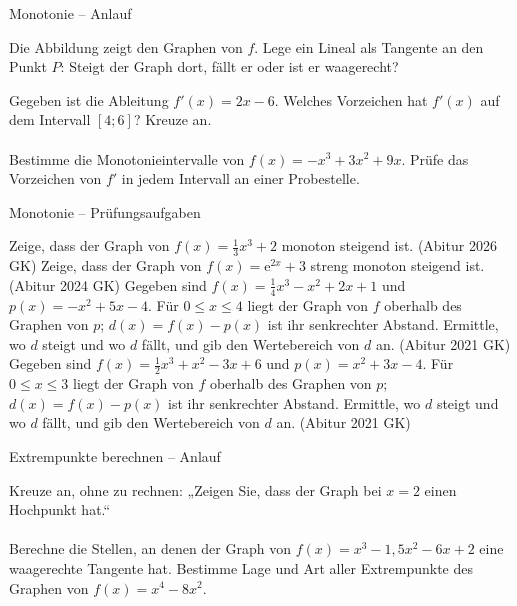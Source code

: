 \setcounter{aufgabe}{15}

\begin{aufgabe}{Monotonie – Anlauf}
\begin{teile}
\teil Die Abbildung zeigt den Graphen von $f$. Lege ein Lineal als Tangente an den Punkt $P$: Steigt der Graph dort, fällt er oder ist er waagerecht? \\   

\begin{ksys}[xmin=-3,xmax=3,ymin=-3,ymax=3,ablesen]   \end{ksys}
\teil Gegeben ist die Ableitung $f'(x) = 2x - 6$. Welches Vorzeichen hat $f'(x)$ auf dem Intervall $[4; 6]$? Kreuze an. \\  \\ 
\teil Bestimme die Monotonieintervalle von $f(x) = -x^3 + 3x^2 + 9x$. Prüfe das Vorzeichen von $f'$ in jedem Intervall an einer Probestelle.
\end{teile}
\end{aufgabe}

\begin{aufgabe}{Monotonie – Prüfungsaufgaben}
\begin{teile}
\teil Zeige, dass der Graph von $f(x) = \frac{1}{3}x^3 + 2$ monoton steigend ist. \hfill (Abitur 2026 GK)
\teil Zeige, dass der Graph von $f(x) = \mathrm{e}^{2x} + 3$ streng monoton steigend ist. \hfill (Abitur 2024 GK)
\teil Gegeben sind $f(x) = \frac{1}{4}x^3 - x^2 + 2x + 1$ und $p(x) = -x^2 + 5x - 4$. Für $0 \le x \le 4$ liegt der Graph von $f$ oberhalb des Graphen von $p$; $d(x) = f(x) - p(x)$ ist ihr senkrechter Abstand. Ermittle, wo $d$ steigt und wo $d$ fällt, und gib den Wertebereich von $d$ an. \hfill (Abitur 2021 GK)
\teil Gegeben sind $f(x) = \frac{1}{2}x^3 + x^2 - 3x + 6$ und $p(x) = x^2 + 3x - 4$. Für $0 \le x \le 3$ liegt der Graph von $f$ oberhalb des Graphen von $p$; $d(x) = f(x) - p(x)$ ist ihr senkrechter Abstand. Ermittle, wo $d$ steigt und wo $d$ fällt, und gib den Wertebereich von $d$ an. \hfill (Abitur 2021 GK)
\end{teile}
\end{aufgabe}

\begin{aufgabe}{Extrempunkte berechnen – Anlauf}
\begin{teile}
\teil Kreuze an, ohne zu rechnen: „Zeigen Sie, dass der Graph bei $x = 2$ einen Hochpunkt hat.“ \\  \\ 
\teil Berechne die Stellen, an denen der Graph von $f(x) = x^3 - 1{,}5x^2 - 6x + 2$ eine waagerechte Tangente hat.
\teil Bestimme Lage und Art aller Extrempunkte des Graphen von $f(x) = x^4 - 8x^2$.
\end{teile}
\end{aufgabe}

